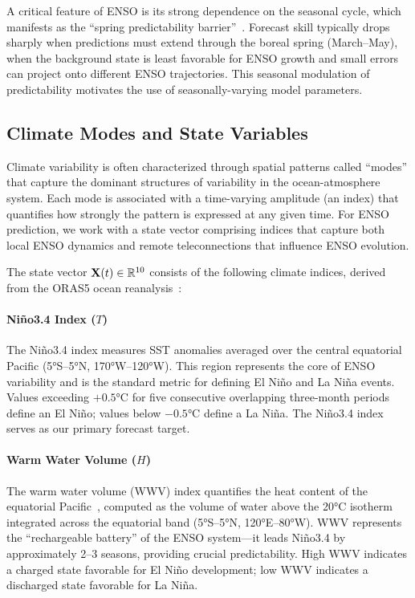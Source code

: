A critical feature of ENSO is its strong dependence on the seasonal cycle, which manifests as the ``spring predictability barrier''~\cite{webster1995monsoon,duan2013predictability}. Forecast skill typically drops sharply when predictions must extend through the boreal spring (March--May), when the background state is least favorable for ENSO growth and small errors can project onto different ENSO trajectories. This seasonal modulation of predictability motivates the use of seasonally-varying model parameters.

\subsection{Climate Modes and State Variables}

Climate variability is often characterized through spatial patterns called ``modes'' that capture the dominant structures of variability in the ocean-atmosphere system. Each mode is associated with a time-varying amplitude (an index) that quantifies how strongly the pattern is expressed at any given time. For ENSO prediction, we work with a state vector comprising indices that capture both local ENSO dynamics and remote teleconnections that influence ENSO evolution.

The state vector $\mathbf{X}(t) \in \mathbb{R}^{10}$ consists of the following climate indices, derived from the ORAS5 ocean reanalysis~\cite{zuo2019oras5}:

\paragraph{Ni\~no3.4 Index ($T$)} The Ni\~no3.4 index measures SST anomalies averaged over the central equatorial Pacific (5°S--5°N, 170°W--120°W). This region represents the core of ENSO variability and is the standard metric for defining El Ni\~no and La Ni\~na events. Values exceeding $+0.5$°C for five consecutive overlapping three-month periods define an El Ni\~no; values below $-0.5$°C define a La Ni\~na. The Ni\~no3.4 index serves as our primary forecast target.

\paragraph{Warm Water Volume ($H$)} The warm water volume (WWV) index quantifies the heat content of the equatorial Pacific~\cite{meinen2000observations}, computed as the volume of water above the 20°C isotherm integrated across the equatorial band (5°S--5°N, 120°E--80°W). WWV represents the ``rechargeable battery'' of the ENSO system---it leads Ni\~no3.4 by approximately 2--3 seasons, providing crucial predictability. High WWV indicates a charged state favorable for El Ni\~no development; low WWV indicates a discharged state favorable for La Ni\~na.

